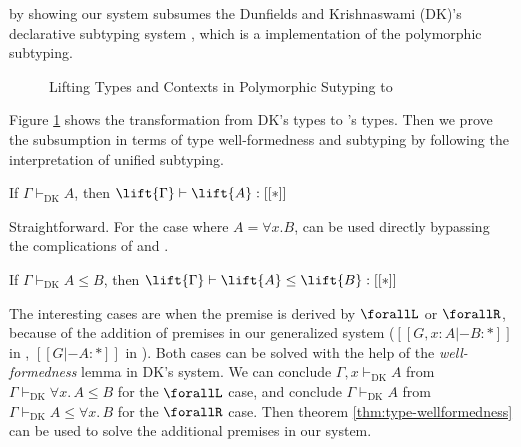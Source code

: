 by showing our system subsumes the Dunfields and Krishnaswami (DK)'s declarative
subtyping system \cite{dunfield2013complete}, which is a implementation of
the polymorphic subtyping.

\begin{figure}
    \caption{Lifting Types and Contexts in Polymorphic Sutyping to \name}
    \label{fig:lift}
\end{figure}
Figure \ref{fig:lift} shows the transformation from
DK's
types to \name's types.
Then we prove the subsumption in terms of type well-formedness and subtyping
by following the interpretation of unified subtyping.

\begin{theorem}
\label{thm:type-wellformedness}
    If $\Gamma \vdash_{\text{DK}} A$, then $\lift{\Gamma} \vdash \lift{A} : [[*]]$
\end{theorem}

Straightforward. For the case where $A = \forall x. B$,  can be
used directly bypassing the complications of  and
.

\begin{theorem}
    If $\Gamma \vdash_{\text{DK}} A \le B$, then $\lift{\Gamma} \vdash \lift{A} \le \lift{B} : [[*]]$
\end{theorem}

The interesting cases are when the premise is derived by $\forallL$ or $\forallR$,
because of the addition of premises in our generalized system
($[[G, x : A |- B : *]]$ in , $[[G |- A : *]]$ in ).
Both cases can be solved with the help of the \emph{well-formedness} lemma in
DK's system. We can conclude $\Gamma, x \vdash_{\text{DK}} A$ from
$\Gamma \vdash_{\text{DK}} \forall x.\, A \le B$ for the $\forallL$ case,
and conclude $\Gamma \vdash_{\text{DK}} A$ from $\Gamma \vdash_{\text{DK}} A \le \forall x.\, B$ for the $\forallR$ case.
Then theorem \ref{thm:type-wellformedness} can be used to solve the additional
premises in our system.

